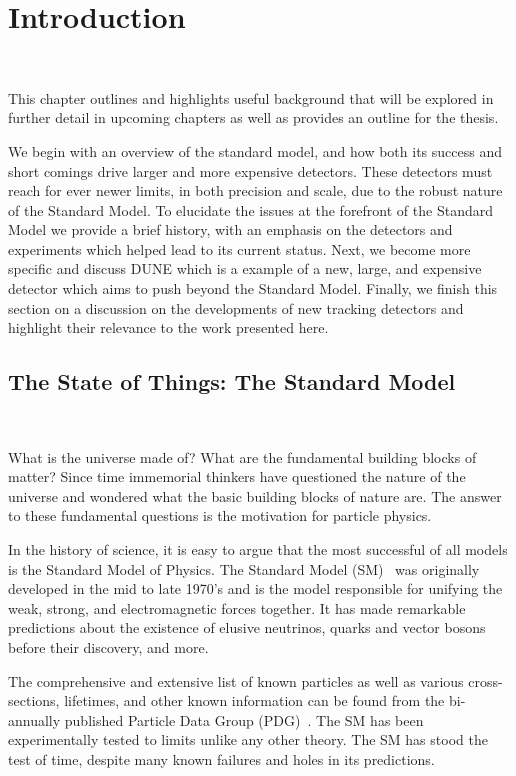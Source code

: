 \chapter{Introduction}~\label{chap:intro}

This chapter outlines and highlights useful background that will be explored in further detail in upcoming chapters as well as provides an outline for the thesis.

We begin with an overview of the standard model, and how both its success and short comings drive larger and more expensive detectors.
These detectors must reach for ever newer limits, in both precision and scale, due to the robust nature of the Standard Model.
To elucidate the issues at the forefront of the Standard Model we provide a brief history, with an emphasis on the detectors and experiments which helped lead to its current status.
Next, we become more specific and discuss DUNE which is a example of a new, large, and expensive detector which aims to push beyond the Standard Model.
Finally, we finish this section on a discussion on the developments of new tracking detectors and highlight their relevance to the work presented here.

\section{The State of Things: The Standard Model}~\label{sec:standard_model}

What is the universe made of?
What are the fundamental building blocks of matter?
Since time immemorial thinkers have questioned the nature of the universe and wondered what the basic building blocks of nature are.
The answer to these fundamental questions is the motivation for particle physics.

In the history of science, it is easy to argue that the most successful of all models is the Standard Model of Physics.
The Standard Model (SM)~\citep{GLASHOW1961579, salam1964electromagnetic, weinberg1967model} was originally developed in the mid to late 1970's and is the model responsible for unifying the weak, strong, and electromagnetic forces together.
It has made remarkable predictions about the existence of elusive neutrinos, quarks and vector bosons before their discovery, and more.

The comprehensive and extensive list of known particles as well as various cross-sections, lifetimes, and other known information can be found from the bi-annually published Particle Data Group (PDG)~\citep{Workman:2022ynf}.
The SM has been experimentally tested to limits unlike any other theory.
The SM has stood the test of time, despite many known failures and holes in its predictions.

